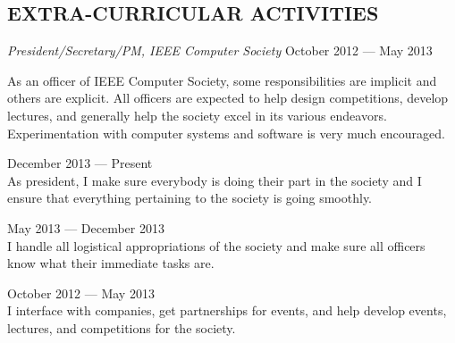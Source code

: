 \documentclass[margin]{res}
\begin{document}
\begin{resume}
  \section{EXTRA-CURRICULAR ACTIVITIES}
  {\sl President/Secretary/PM, IEEE Computer Society}
  \hfill October 2012 --- May 2013 \\
  \vspace{-1.0em}
  \begin{adjustwidth}{1.5em}{0pt}
    As an officer of IEEE Computer Society, some responsibilities are
    implicit and others are explicit. All officers are expected to
    help design competitions, develop lectures, and generally help the
    society excel in its various endeavors. Experimentation with
    computer systems and software is very much encouraged.
    \begin{description}[leftmargin=1.5em]
    \item [President] \hfill December 2013 --- Present \\
      As president, I make sure everybody is doing their part in the
      society and I ensure that everything pertaining to the society is
      going smoothly.
    \item [Secretary] \hfill May 2013 --- December 2013 \\
      I handle all logistical appropriations of the society and make
      sure all officers know what their immediate tasks are.
    \item [Project Manager] \hfill October 2012 --- May 2013 \\
      I interface with companies, get partnerships for events, and
      help develop events, lectures, and competitions for the
      society.
    \end{description}
  \end{adjustwidth}

\end{resume}
\end{document}
